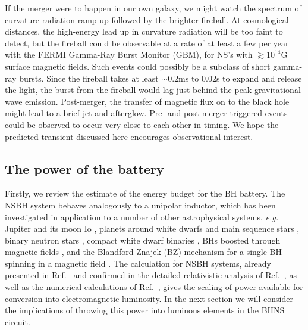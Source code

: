 If the merger were to happen in our own
galaxy, we might watch the spectrum of curvature radiation ramp up
followed by the brighter fireball. At cosmological distances, the
high-energy lead up in curvature radiation will be too faint to
detect, but the fireball could be observable at a rate of at least a
few per year with the FERMI Gamma-Ray Burst Monitor (GBM), for NS's
with $\gtrsim10^{14}$G surface magnetic fields.  Such events 
could possibly be a subclass of short gamma-ray
bursts. Since the fireball takes at least $\sim 0.2$ms to $0.02$s 
to expand and release the light, the burst from the
fireball would lag just behind the peak gravitational-wave emission.
Post-merger, the transfer of magnetic flux on to the black hole might
lead to a brief jet and afterglow. 
Pre- and post-merger triggered events could be observed to occur very close to each other in timing.
We hope the predicted transient discussed here encourages observational interest.



\subsection{The power of the battery}
\label{Orbital inspiral battery}
Firstly, we review the estimate of the energy budget for the BH
battery. The NSBH system behaves analogously to a unipolar inductor, which has been investigated in application 
to a number of other astrophysical systems, \textit{e.g.} Jupiter and 
its moon Io \citep{GLB:1969}, planets around white dwarfs \citep{Li:1998} and main sequence stars \citep{LaineLinI:2012,LaineLinII:2012}, 
binary neutron stars \citep{Vietri:1996,Piro:2012, DLai:2012, Palenzuela:2013}, 
compact white dwarf binaries \citep{Wu:2002, Dall'Osso:2006, Dall'Osso:2007, 
DLai:2012}, BHs boosted through magnetic fields 
\citep{Lyut:2011, Penna:2015}, and the Blandford-Znajek (BZ) mechanism \citep{BZ:1977} for a single BH spinning in a magnetic field  \citep[for recent numerical work on the BZ mechanism see \textit{e.g.}][]{PalenzuelaBZ:2011, Kiuchi:2015}. The calculation for NSBH systems, 
already presented in Ref.\ \cite{McL:2011}
and confirmed in the detailed relativistic analysis of
Ref.\ \cite{DorazioLevin:2013}, as well as the numerical calculations
of Ref.\ \cite{Paschalidis:2013}, gives the scaling of power available
for conversion into electromagnetic luminosity. In the next section we
will consider the implications of throwing this power into luminous
elements in the BHNS circuit.

